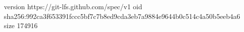 version https://git-lfs.github.com/spec/v1
oid sha256:992ca3f653391fccc5bf7c7b8ed9cda3eb7a9884e9644b0c514c4a50b5eeb4a6
size 174916
